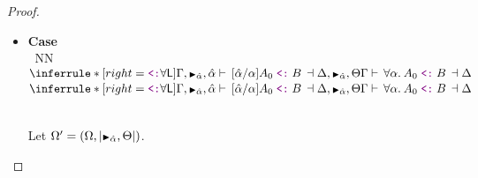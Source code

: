 \documentclass[a4paper]{article}
\makeatletter
\newcommand{\smallblacktriangle}{\text{\textscale{0.7}{$\blacktriangleright$}}}
\newcommand{\arr}{\rightarrow}
\def\CompactJudgments{0}
\newcommand{\entails}{\mathrel{\ifnum\CompactJudgments=1\vdash \else \vdash\,\fi}}
\newcommand{\ctxoutsym}{\ifnum\CompactJudgments=1\dashv \else \,\dashv \fi}
\newcommand{\ctxout}[1]{\mathrel{\ctxoutsym}{#1}}
\newcommand{\MonnierCommaSym}{{\smallblacktriangle}}
\newcommand{\MonnierComma}[1]{{\MonnierCommaSym}_{#1}}
\newcommand{\subtypingycolor}[1]{\textcolor{dDigPurple}{#1}}
\newcommand{\subtype}{\mathrel{\normalfont\texttt{\subtypingycolor{<:}}}}  \newcommand{\declsubtype}{\mathrel{\leq}}
\newcommand{\Lemmaref}[1]{Lemma \ref{#1} (\nameref{#1})}   \newcommand{\Lemref}[1]{\Lemma \ref{#1}}   \newcommand{\Conjectureref}[1]{Conjecture \ref{#1}}
\gdef\xxDerivationProofCaseColor{N}
\newcommand{\DerivationProofCase}[3]{\smallskip
     \item \parbox[t]{100ex}{\textbf{Case } \\[-0.5em]
       $~$\hspace{5ex}
       \if\xxDerivationProofCaseColor N\ensuremath{\Infer{#1}{#2}{#3}}
       \else \colorbox{\xxDerivationProofCaseColor}{\ensuremath{\Infer{#1}{#2}{#3}}}\fi }\nopagebreak \\[-0.8ex]
  }
\newcommand{\BeginProof}{\renewcommand{\arraystretch}{1.1} \begin{tabular}[b]{r@{}r @{} l  l}}
\newcommand{\EndProof}{\end{tabular} \renewcommand{\arraystretch}{\mydefaultarraystretch}}
\newcommand{\Pf}[4] {&$#1$ $#2$\, & $#3$ & #4 \\}
\newcommand{\proofsep}{\,\\[-0.5em]}
\newenvironment{llproof}{\BeginProof}{\EndProof}
\newcommand{\AllSym}{\forall}
\newcommand{\xAll}[1]{\AllSym#1}
\newcommand{\All}[1]{\xAll{#1}.\:}
\newcommand{\Infer}[3]{\inferrule*[right={\text{\strut#1}}]{{}#2\mathstrut}{{}#3\mathstrut}}
\newcommand{\subjudg}[4]{\ensuremath{{#1} \entails {#2} \subtype {#3} \ctxout{#4}}}
\newcommand{\declsubjudgPf}[4] {\Pf{#1}{\entails}{{#2} \declsubtype {#3}}{#4}}
\newcommand{\subjudgPf}[5] {\Pf{#1}{\entails}{{#2} \subtype {#3} \ctxout{#4}}{#5}}
\newcommand{\alltype}[1]{\All{#1}}
\newcommand{\extendssym}{\longrightarrow}
\newcommand{\extends}[2]{{#1} \extendssym {#2}}
\newcommand{\substextend}[2]{\extends{#1}{#2}}
\newcommand{\ahat}{\hat{\alpha}}
\newcommand{\rulename}[1]{\text{\normalfont\textsf{#1}}}
\newcommand{\Dsubrulename}[1]{\ensuremath{{\declsubtype}\rulename{#1}}\xspace}
\newcommand{\DsubArr}{\Dsubrulename{\ensuremath{\arr}}}
\newcommand{\soln}[1]{\left|{#1}\right|}
\makeatother
\begin{document}
\begin{proof}
\begin{itemize}
          \begin{llproof}
            \subjudgPf{\Gamma}{B_1}{A_1}{\Theta} {Subderivation}
            \Pf{}{}{\substextend{\Delta}{\Omega}} {Given}
            \Pf{}{}{\substextend{\Theta}{\Omega}} {By \Lemmaref{lem:substextend-transitivity}} 
            \declsubjudgPf{[\Omega]\Theta} {[\Omega]B_1} {[\Omega]A_1}  {By i.h.}
            \declsubjudgPf{[\Omega]\Delta} {[\Omega]B_1} {[\Omega]A_1}  {By \Lemmaref{lem:completes-confluence}}
            \proofsep
            \subjudgPf{\Theta}{[\Theta]A_2}{[\Theta]B_2}{\Delta} {Subderivation}
            \declsubjudgPf{[\Omega]\Delta} {[\Omega][\Theta]A_2} {[\Omega][\Theta]B_2}  {By i.h.}
            \Pf{}{}{[\Omega][\Theta]A_2 = [\Omega]A_2}  {By \Lemmaref{lem:subst-extension-invariance}}
            \Pf{}{}{[\Omega][\Theta]B_2 = [\Omega]B_2}  {By \Lemmaref{lem:subst-extension-invariance}}
            \declsubjudgPf{[\Omega]\Delta} {[\Omega]A_2} {[\Omega]B_2}  {Above equations}
            \proofsep
            \declsubjudgPf{[\Omega]\Delta} {([\Omega]A_1) \arr ([\Omega]A_2)}
                                        {([\Omega]B_1) \arr ([\Omega]B_2)}  {By \DsubArr}
            \declsubjudgPf{[\Omega]\Delta} {[\Omega](A_1 \arr A_2)}
                                        {[\Omega](B_1 \arr B_2)}  {By def. of substitution}
          \end{llproof}

     \DerivationProofCase{\SubAllL}
          {\subjudg{\Gamma, \MonnierComma{\ahat}, \ahat}
                   {[\ahat/\alpha]A_0}
                   {B}
                   {\Delta, \MonnierComma{\ahat}, \Theta}}
          {\subjudg{\Gamma}{\alltype{\alpha}{A_0}}{B}{\Delta}}

          Let $\Omega' = (\Omega, \soln{\MonnierComma{\ahat}, \Theta})$.
          

\end{itemize}
\end{proof}
\end{document}
